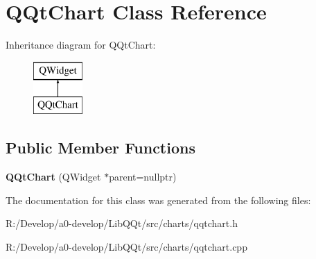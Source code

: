 \hypertarget{class_q_qt_chart}{}\section{Q\+Qt\+Chart Class Reference}
\label{class_q_qt_chart}
Inheritance diagram for Q\+Qt\+Chart\+:\begin{figure}[H]
\begin{center}
\leavevmode
\includegraphics[height=2.000000cm]{class_q_qt_chart}
\end{center}
\end{figure}
\subsection*{Public Member Functions}
\begin{DoxyCompactItemize}
\item 
\mbox{\label{class_q_qt_chart_a501d72000047d0bf85359369fefddeda}} 
{\bfseries Q\+Qt\+Chart} (Q\+Widget $\ast$parent=nullptr)
\end{DoxyCompactItemize}


The documentation for this class was generated from the following files\+:\begin{DoxyCompactItemize}
\item 
R\+:/\+Develop/a0-\/develop/\+Lib\+Q\+Qt/src/charts/qqtchart.\+h\item 
R\+:/\+Develop/a0-\/develop/\+Lib\+Q\+Qt/src/charts/qqtchart.\+cpp\end{DoxyCompactItemize}
